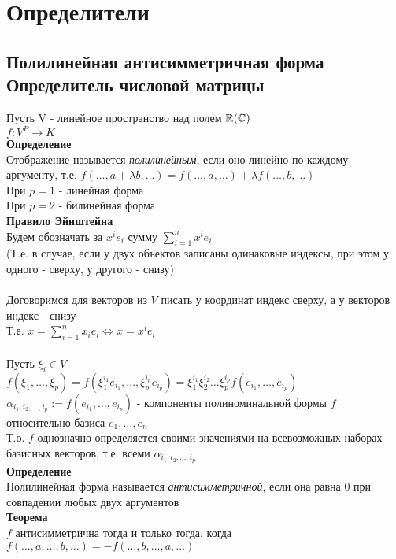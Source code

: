 \documentclass[12pt]{article}
\begin{document}
\section{Определители}
\subsection{Полилинейная антисимметричная форма\\Определитель числовой матрицы}
Пусть V - линейное пространство над полем $\mathbb{R}(\mathbb{C})$\\
$f: V^P \rightarrow K$\\
\textbf{Определение}\\
Отображение называется \textit{полилинейным}, если оно линейно по каждому аргументу, т.е. $f(\ldots, a+\lambda b, \ldots) = f(\ldots, a, \ldots) + \lambda f(\ldots,b,\ldots)$\\
При $p = 1$ - линейная форма\\
При $p = 2$ - билинейная форма\\
\textbf{Правило Эйнштейна}\\
Будем обозначать за $x^i e_i$ сумму $\sum_{i=1}^n x^ie_i$\\
(Т.е. в случае, если у двух объектов записаны одинаковые индексы, при этом у одного - сверху, у другого - снизу)\\\\
Договоримся для векторов из $V$ писать у координат индекс сверху, а у векторов индекс - снизу\\
Т.е. $x=\sum_{i=1}^n x_ie_i \Leftrightarrow x = x^ie_i$\\\\
Пусть $\xi_i \in V$\\
$f(\xi_1, \ldots, \xi_p) = f(\xi_1^{i_1}e_{i_1}, \ldots, \xi_p^{i_p}e_{i_p}) = \xi_1^{i_1}\xi_2^{i_2}\ldots\xi_p^{i_p}f(e_{i_1}, \ldots, e_{i_p})$\\
$\alpha_{i_1,i_2,\ldots, i_p} := f(e_{i_1}, \ldots, e_{i_p})$ - компоненты полиноминальной формы $f$ относительно базиса $e_1, \ldots, e_n$\\
Т.о. $f$ однозначно определяется своими значениями на всевозможных наборах базисных векторов, т.е. всеми $\alpha_{i_1,i_2,\ldots, i_p}$\\
\textbf{Определение}\\
Полилинейная форма называется \textit{антисимметричной}, если она равна 0 при совпадении любых двух аргументов\\
\textbf{Теорема}\\
$f$ антисимметрична тогда и только тогда, когда $f(\ldots,a,\ldots, b,\ldots) = -f(\ldots, b, \ldots, a, \ldots)$\\
\end{document}
